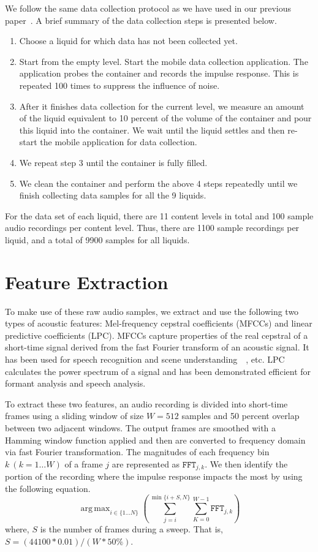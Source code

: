 \documentclass{article} %
\DeclareMathOperator*{\argmax}{arg\,max}
\begin{document}
We follow the same data collection protocol as we have used in our previous paper~\cite{fan2015soqr}. A brief summary of the data collection steps is presented below.
\begin{enumerate}
\item Choose a liquid for which data has not been collected yet.

\item Start from the empty level. Start the mobile data collection application. The application probes the container and records the impulse response. This is repeated 100 times to suppress the influence of noise.

\item After it finishes data collection for the current level, we measure an amount of the liquid equivalent to 10 percent of the volume of the container and pour this liquid into the container. We wait until the liquid settles and then re-start the mobile application for data collection.

\item We repeat step 3 until the container is fully filled.

\item We clean the container and perform the above 4 steps repeatedly until we finish collecting data samples for all the 9 liquids.

\end{enumerate}

For the data set of each liquid, there are 11 content levels in total and 100 sample audio recordings per content level. Thus, there are 1100 sample recordings per liquid, and a total of 9900 samples for all liquids.

\section{Feature Extraction}
To make use of these raw audio samples, we extract and use the following two types of acoustic features: Mel-frequency cepstral coefficients (MFCCs) and linear predictive coefficients (LPC). MFCCs capture properties of the real cepstral of a short-time signal derived from the fast Fourier transform of an acoustic signal. It has been used for speech recognition and scene understanding~\cite{kunze2007symbolic}~\cite{fan2014public}, etc. LPC calculates the power spectrum of a signal and has been demonstrated efficient for formant analysis and speech analysis. 

To extract these two features, an audio recording is divided into short-time frames using a sliding window of size $W = 512$ samples and 50 percent overlap between two adjacent windows. The output frames are smoothed with a Hamming window function applied and then are converted to frequency domain via fast Fourier transformation. The magnitudes of each frequency bin $k\ (k=1\dots W)$ of a frame $j$ are represented as $\mathtt{FFT}_{j,k}$. We then identify the portion of the recording where the impulse response impacts the most by using the following equation.
\[\argmax_{i\in\{1\dots N\}}\left(\sum_{j=i}^{\min \{i+S, N\}}\sum_{K=0}^{W-1}\mathtt{FFT}_{j,k}\right)\]
where, $S$ is the number of frames during a sweep. That is, $S=(44100*0.01)/(W*50\%)$.
\end{document}
